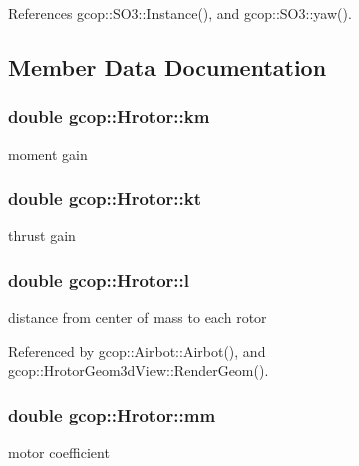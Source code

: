 \-References gcop\-::\-S\-O3\-::\-Instance(), and gcop\-::\-S\-O3\-::yaw().



\subsection{\-Member \-Data \-Documentation}
\subsubsection[{km}]{\setlength{\rightskip}{0pt plus 5cm}double {\bf gcop\-::\-Hrotor\-::km}}\label{classgcop_1_1Hrotor_a5a6f3a96099d84456cacb92141e40e9a}


moment gain 

\subsubsection[{kt}]{\setlength{\rightskip}{0pt plus 5cm}double {\bf gcop\-::\-Hrotor\-::kt}}\label{classgcop_1_1Hrotor_af54ec806b95aa7ca282293d81070512c}


thrust gain 

\subsubsection[{l}]{\setlength{\rightskip}{0pt plus 5cm}double {\bf gcop\-::\-Hrotor\-::l}}\label{classgcop_1_1Hrotor_a7a0a70a964d7988e26b767b56b294276}


distance from center of mass to each rotor 



\-Referenced by gcop\-::\-Airbot\-::\-Airbot(), and gcop\-::\-Hrotor\-Geom3d\-View\-::\-Render\-Geom().

\subsubsection[{mm}]{\setlength{\rightskip}{0pt plus 5cm}double {\bf gcop\-::\-Hrotor\-::mm}}\label{classgcop_1_1Hrotor_aad8b780bc5d3396395d9a23577354b0d}


motor coefficient 


